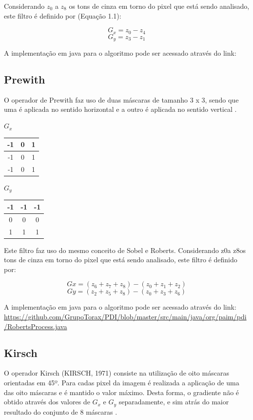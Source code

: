 \documentclass[
	12pt,				%
	oneside,			%
	a4paper,			%
	english,			%
	french,				%
	spanish,			%
	brazil,				%
	]{abntex2}
\begin{document}
Considerando \(z_0\) a \(z_8\) os tons de cinza em torno do pixel que está sendo analisado, este filtro é definido por (Equação 1.1):

\[G_x = z_0 - z_4\]
\[G_y = z_3 -z_1\]

A implementação em java para o algoritmo pode ser acessado através do link:

\subsection{Prewith}

O operador de Prewith faz uso de duas máscaras de tamanho 3 x 3, sendo que uma é aplicada no sentido horizontal e a outro é aplicada no sentido vertical \cite{pedriniSchwartz:2008}.	

\(G_x\)
\begin{tabular}{|c|c|c|}
	\hline
    -1 & 0 & 1   \\ \hline
	-1 & 0 & 1   \\ \hline   
	-1 & 0 & 1   \\ \hline   
\end{tabular}
\(G_y\)
\begin{tabular}{|c|c|c|}
    \hline
    -1 & -1 & -1   \\ \hline
	 0 &  0 &  0   \\ \hline   
	 1 &  1 &  1   \\ \hline   
\end{tabular}

Este filtro faz uso do mesmo conceito de Sobel e Roberts. Considerando z0a z8os tons de cinza em torno do pixel que está sendo analisado, este filtro é definido por:

\[Gx = (z_6 + z_7 + z_8) - (z_0 + z_1 + z_2)\]
\[Gy = (z_2 + z_5 + z_8) - (z_0 + z_3 + z_6)\]

A implementação em java para o algoritmo pode ser acessado através do link:
\url{https://github.com/GrupoTorax/PDI/blob/master/src/main/java/org/paim/pdi/RobertsProcess.java} 

\subsection{Kirsch}
O operador Kirsch (KIRSCH, 1971) consiste na utilização de oito máscaras orientadas em 45º. Para cadas pixel da imagem é realizada a aplicação de uma das oito máscaras e é mantido o valor máximo. Desta forma, o gradiente não é obtido através dos valores de \(G_x\) e \(G_y\) separadamente, e sim  atrás do maior resultado do conjunto de 8 máscaras \cite{pedriniSchwartz:2008}.
\end{document}
